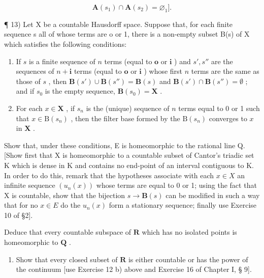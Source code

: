 \[
\mathbf {A} (s _ {1}) \cap \mathbf {A} (s _ {2}) = \varnothing_ {1} ].
\]

¶ 13) Let X be a countable Hausdorff space. Suppose that, for each finite sequence s all of whose terms are o or 1, there is a non-empty subset B(s) of X which satisfies the following conditions:

\begin{enumerate}
\def\labelenumi{(\roman{enumi})}
\item
  If \(s\) is a finite sequence of \(n\) terms (equal to \(\mathbf{o}\) or \(\mathbf{i}\) ) and \(s', s''\) are the sequences of \(n + \mathbf{i}\) terms (equal to \(\mathbf{o}\) or \(\mathbf{i}\) ) whose first \(n\) terms are the same as those of \(s\) , then \(\mathbf{B}(s') \cup \mathbf{B}(s'') = \mathbf{B}(s)\) and \(\mathbf{B}(s') \cap \mathbf{B}(s'') = \emptyset\) ; and if \(s_0\) is the empty sequence, \(\mathbf{B}(s_0) = \mathbf{X}\) .
\item
  For each \(x \in \mathbf{X}\) , if \(s_n\) is the (unique) sequence of \(n\) terms equal to 0 or 1 such that \(x \in \mathrm{B}(s_n)\) , then the filter base formed by the \(\mathrm{B}(s_n)\) converges to \(x\) in \(\mathbf{X}\) .
\end{enumerate}

Show that, under these conditions, E is homeomorphic to the rational line Q. {[}Show first that X is homeomorphic to a countable subset of Cantor's triadic set K which is dense in K and contains no end-point of an interval contiguous to K. In order to do this, remark that the hypotheses associate with each \(x \in X\) an infinite sequence \((u_{n}(x))\) whose terms are equal to 0 or 1; using the fact that X is countable, show that the bijection \(s \to \mathbf{B}(s)\) can be modified in such a way that for no \(x \in E\) do the \(u_{n}(x)\) form a stationary sequence; finally use Exercise 10 of §2{]}.

Deduce that every countable subspace of \(\mathbf{R}\) which has no isolated points is homeomorphic to \(\mathbf{Q}\) .

\begin{enumerate}
\def\labelenumi{\arabic{enumi})}
\setcounter{enumi}{13}
\tightlist
\item
  Show that every closed subset of \(\mathbf{R}\) is either countable or has the power of the continuum {[}use Exercise 12 b) above and Exercise 16 of Chapter I, § 9{]}.
\end{enumerate}


